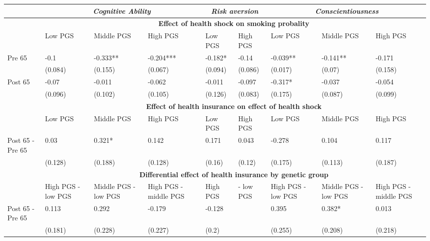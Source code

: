 % 
\begin{tabular}{l| p{2.5cm}p{2.5cm}p{2.5cm}| p{2.5cm}p{2.5cm}| p{2.5cm}p{2.5cm}p{2.5cm}}
  & \multicolumn{3}{c}{ \textit{Cognitive Ability}} &  \multicolumn{2}{c}{ \textit{Risk aversion}} &  \multicolumn{3}{c}{ \textit{Conscientiousness}}  \\
 \toprule
  & \multicolumn{8}{c}{\textbf{Effect of health shock on smoking probality}} \\
 \midrule
 & Low PGS & Middle PGS & High PGS & Low PGS & High PGS & Low PGS & Middle PGS & High PGS \\ 
   \midrule
Pre 65 & -0.1 & -0.333** & -0.204*** & -0.182* & -0.14 & -0.039** & -0.141** & -0.171 \\ 
   & (0.084) & (0.155) & (0.067) & (0.094) & (0.086) & (0.017) & (0.07) & (0.158) \\ 
  Post 65 & -0.07 & -0.011 & -0.062 & -0.011 & -0.097 & -0.317* & -0.037 & -0.054 \\ 
   & (0.096) & (0.102) & (0.105) & (0.126) & (0.083) & (0.175) & (0.087) & (0.099) \\ 
   \toprule & \multicolumn{8}{c}{ \textbf{Effect of health insurance on effect of health shock}} \\
 \midrule
 & Low PGS & Middle PGS & High PGS & Low PGS & High PGS & Low PGS & Middle PGS & High PGS \\ 
   \midrule
Post 65 - Pre 65 & 0.03 & 0.321* & 0.142 & 0.171 & 0.043 & -0.278 & 0.104 & 0.117 \\ 
   & (0.128) & (0.188) & (0.128) & (0.16) & (0.12) & (0.175) & (0.113) & (0.187) \\ 
   \toprule & \multicolumn{8}{c}{ \textbf{Differential effect of health insurance by genetic group}} \\
 \midrule
 & High PGS - low PGS & Middle PGS - low PGS & High PGS - middle PGS & High PGS  & - low PGS & High PGS - low PGS & Middle PGS - low PGS & High PGS - middle PGS \\ 
   \midrule
Post 65 - Pre 65 & 0.113 & 0.292 & -0.179 & -0.128 &  & 0.395 & 0.382* & 0.013 \\ 
   & (0.181) & (0.228) & (0.227) & (0.2) &  & (0.255) & (0.208) & (0.218) \\ 
  \end{tabular}
